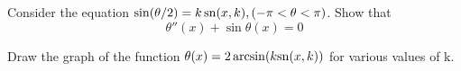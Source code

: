 
\begin{exercise}

Consider the equation $\sin(\theta/2) = k\, \mathrm{sn}(x,k), (-\pi <\theta < \pi)$.  Show that
\[\theta''(x)+ \sin  \theta(x)=0\]

Draw the graph of the function $\theta(x)=2\arcsin( k\mathrm{sn}(x,k))$ for various values of k.
\end{exercise}

\begin{exercise}

\end{exercise}